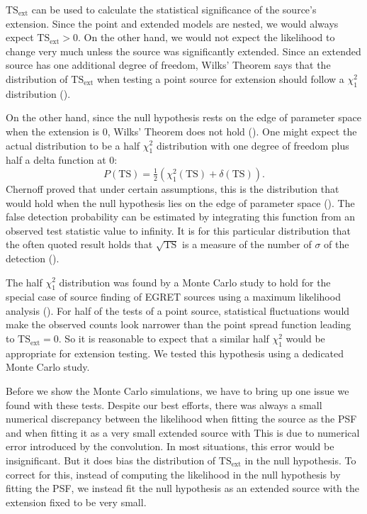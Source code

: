 \documentclass[12pt,preprint]{aastex}
\newcommand{\tsext}{{\ensuremath{\text{TS}_\text{ext}}}\xspace}
\newcommand{\ts}{\text{TS}\xspace}
\begin{document}
\tsext can be used to calculate the statistical significance of the
source's extension.  Since the point and extended models are nested, we
would always expect $\tsext>0$.  On the other hand, we would not expect
the likelihood to change very much unless the source was significantly
extended.  Since an extended source has one additional degree of freedom,
Wilks' Theorem says that the distribution of $\tsext$ when testing
a point source for extension should follow a $\chi^2_1$ distribution
(\cite{wilks_theorem}).

On the other hand, since the null hypothesis rests on the edge of
parameter space when the extension is 0, Wilks' Theorem does not hold
(\cite{warn_wilks_theorem}).  One might expect the actual distribution
to be a half $\chi^2_1$ distribution with one degree of freedom plus
half a delta function at 0:
\begin{equation}
  P(\ts)=\tfrac{1}{2}(\chi^2_1(\ts)+\delta(\ts)).
\end{equation}
Chernoff proved that under certain assumptions, this is the distribution
that would hold when the null hypothesis lies on the edge of parameter
space (\cite{chernoff}).  The false detection
probability can be estimated by integrating this function from an observed
test statistic value to infinity. It is for this particular distribution
that the often quoted result holds that $\sqrt{\ts}$ is a measure of
the number of $\sigma$ of the detection (\cite{mattox_egret}).

The half $\chi^2_1$ distribution was found by a Monte Carlo study to hold
for the special case of source finding of EGRET sources using a maximum
likelihood analysis (\cite{mattox_egret}).  For half of the tests of a
point source, statistical fluctuations would make the observed counts look
narrower than the point spread function leading to $\tsext=0$. So it is
reasonable to expect that a similar half $\chi^2_1$ would be appropriate
for extension testing. We tested this hypothesis using a dedicated Monte
Carlo study.

Before we show the Monte Carlo simulations, we have to bring up one issue
we found with these tests.  Despite our best efforts, there was always
a small numerical discrepancy between the likelihood when fitting the
source as the PSF and when fitting it as a very small extended source
with This is due to numerical error introduced by the convolution.
In most situations, this error would be insignificant. But it does bias the
distribution of \tsext in the null hypothesis. To correct for this,
instead of computing the likelihood in the null hypothesis by fitting
the PSF, we instead fit the null hypothesis as an extended source with
the extension fixed to be very small.
\end{document}
